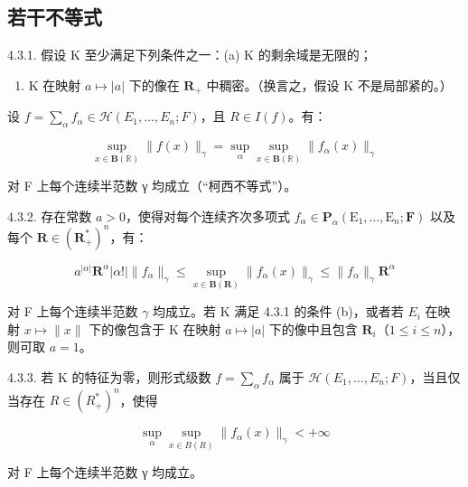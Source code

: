 \subsection{若干不等式}

4.3.1. 假设 K 至少满足下列条件之一：(a) K 的剩余域是无限的；

\begin{enumerate}
\def\labelenumi{(\alph{enumi})}
\setcounter{enumi}{1}
\tightlist
\item
  K 在映射 \(a \mapsto |a|\) 下的像在 \(\mathbf{R}_{+}\) 中稠密。（换言之，假设 K 不是局部紧的。）
\end{enumerate}

设 \(f = \sum_{\alpha} f_{\alpha} \in \mathcal{H}(E_1, \ldots, E_n; F)\)，且 \(R \in I(f)\)。有：

\[
\sup _ {x \in \mathbf {B} (\mathbb {R})} \| f (x) \| _ {\gamma} = \sup _ {\alpha} \sup _ {x \in \mathbf {B} (\mathbb {R})} \| f _ {\alpha} (x) \| _ {\gamma}
\]

对 F 上每个连续半范数 γ 均成立（“柯西不等式”）。

4.3.2. 存在常数 \(a > 0\)，使得对每个连续齐次多项式 \(f_{\alpha} \in \mathbf{P}_{\alpha}(\mathrm{E}_{1}, \ldots, \mathrm{E}_{n}; \mathbf{F})\) 以及每个 \(\mathbf{R} \in (\mathbf{R}_{+}^{*})^{n}\)，有：

\[
a ^ {| \alpha |} \mathbf {R} ^ {\alpha} | \alpha ! | \| f _ {\alpha} \| _ {\gamma} \leqslant \sup _ {x \in \mathbf {B} (\mathbf {R})} \| f _ {\alpha} (x) \| _ {\gamma} \leqslant \| f _ {\alpha} \| _ {\gamma} \mathbf {R} ^ {\alpha}
\]

对 F 上每个连续半范数 \(\gamma\) 均成立。若 K 满足 4.3.1 的条件 (b)，或者若 \(E_{i}\) 在映射 \(x \mapsto \|x\|\) 下的像包含于 K 在映射 \(a \mapsto |a|\) 下的像中且包含 \(\mathbf{R}_{i}\)（\(1 \leqslant i \leqslant n\)），则可取 \(a = 1\)。

4.3.3. 若 K 的特征为零，则形式级数 \(f = \sum_{\alpha} f_{\alpha}\) 属于 \(\mathcal{H}(E_1, \ldots, E_n; F)\)，当且仅当存在 \(R \in (R_+^*)^n\)，使得

\[
\sup _ {\alpha} \sup _ {x \in B (R)} \| f _ {\alpha} (x) \| _ {\gamma} <   + \infty
\]

对 F 上每个连续半范数 γ 均成立。

